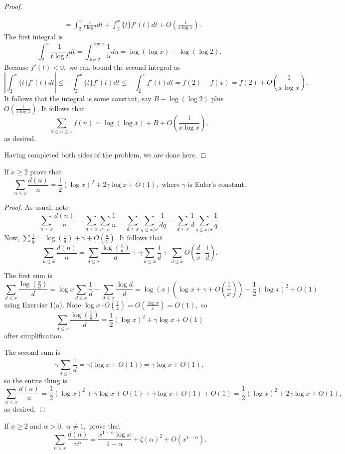 \begin{proof}
\begin{enumerate}[label=(\alph*)]
\begin{align*}
        &= \int_2^x\frac1{t\log t}dt+\int_2^x\{t\}f'(t)dt+O\left(\frac1{x\log x}\right).
    \end{align*}
    The first integral is
    \[\int_2^x\frac1{t\log t}dt=\int_{\log 2}^{\log x}\frac1udu=\log(\log x)-\log(\log 2).\]
    Because $f'(t)<0,$ we can bound the second integral as
    \[\left|\int_2^x\{t\}f'(t)dt\right|\le-\int_2^x\{t\}f'(t)dt\le-\int_2^xf'(t)dt=f(2)-f(x)=f(2)+O\left(\frac1{x\log x}\right).\]
    It follows that the integral is some constant, say $B-\log(\log2)$ plus $O\left(\frac1{x\log x}\right).$ It follows that
    \[\sum_{2\le n\le x}f(n)=\log(\log x)+B+O\left(\frac1{x\log x}\right),\]
    as desired.
\end{enumerate}
Having completed both sides of the problem, we are done here.
\end{proof}

\begin{exercise}
If $x\ge2$ prove that
\[\sum_{n\le x}\frac{d(n)}n=\frac12(\log x)^2+2\gamma\log x+O(1),\text{ where $\gamma$ is Euler's constant.}\]
\end{exercise}

\begin{proof}
As usual, note
\[\sum_{n\le x}\frac{d(n)}n=\sum_{n\le x}\sum_{d\mid n}\frac1n=\sum_{d\le x}\sum_{q\le x/d}\frac1{dq}=\sum_{d\le x}\frac1d\sum_{q\le x/d}\frac1q.\]
Now, $\sum\frac1q=\log\left(\frac xd\right)+\gamma+O\left(\frac dx\right).$ It follows that
\[\sum_{n\le x}\frac{d(n)}n=\sum_{d\le x}\frac{\log\left(\frac xd\right)}d+\gamma\sum_{d\le x}\frac1d+\sum_{d\le x}O\left(\frac dx\cdot\frac 1d\right).\]

The first sum is
\[\sum_{d\le x}\frac{\log\left(\frac xd\right)}d=\log x\sum_{d\le x}\frac1d-\sum_{d\le x}\frac{\log d}d=\log(x)\left(\log x+\gamma+O\left(\frac1x\right)\right)-\frac12(\log x)^2+O(1)\]
using Exercise 1(a). Note $\log x\cdot O\left(\frac 1x\right)=O\left(\frac{\log x}x\right)=O(1),$ so
\[\sum_{d\le x}\frac{\log\left(\frac xd\right)}d=\frac12(\log x)^2+\gamma\log x+O(1)\]
after simplification.

The second sum is
\[\gamma\sum_{d\le x}\frac1d=\gamma\big(\log x+O(1)\big)=\gamma\log x+O(1),\]
so the entire thing is
\[\sum_{n\le x}\frac{d(n)}n=\frac12(\log x)^2+\gamma\log x+O(1)+\gamma\log x+O(1)+O(1)=\frac12(\log x)^2+2\gamma\log x+O(1),\]
as desired.
\end{proof}

\begin{exercise}
If $x\ge2$ and $\alpha>0,$ $\alpha\ne1,$ prove that
\[\sum_{n\le x}\frac{d(n)}{n^\alpha}=\frac{x^{1-\alpha}\log x}{1-\alpha}+\zeta(\alpha)^2+O\left(x^{1-\alpha}\right).\]
\end{exercise}

